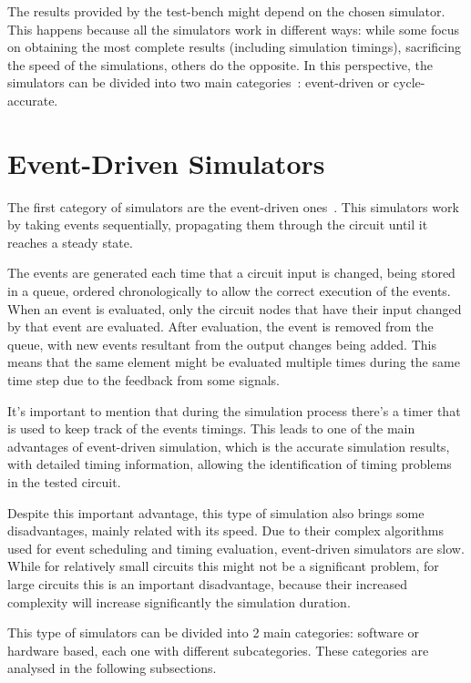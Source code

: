 The results provided by the test-bench might depend on the chosen
simulator. This happens because all the simulators work in different ways: while
some focus on obtaining the most complete results (including simulation
timings), sacrificing the speed of the simulations, others do the opposite. In
this perspective, the simulators can be divided into two main categories~\cite{tan:vhstas,palnitkar:verilog}: event-driven or cycle-accurate.

\section{Event-Driven Simulators}
\label{section:event}

The first category of simulators are the event-driven
ones~\cite{tan:vhstas,gunes:survey,palnitkar:verilog}. This simulators work by
taking events sequentially, propagating them through the circuit until it
reaches a steady state.

The events are generated each time that a circuit input is changed, being stored
in a queue, ordered chronologically to allow the correct execution of the
events. When an event is evaluated, only the circuit nodes that have their input
changed by that event are evaluated. After evaluation, the event is removed from
the queue, with new events resultant from the output changes being added. This
means that the same element might be evaluated multiple times during the same
time step due to the feedback from some signals.

It's important to mention that during the simulation process there's a timer
that is used to keep track of the events timings. This leads to one of the main
advantages of event-driven simulation, which is the accurate simulation results,
with detailed timing information, allowing the identification of timing problems
in the tested circuit.

Despite this important advantage, this type of simulation also brings some
disadvantages, mainly related with its speed. Due to their complex algorithms
used for event scheduling and timing evaluation, event-driven simulators are
slow. While for relatively small circuits this might not be a significant
problem, for large circuits this is an important disadvantage, because their
increased complexity will increase significantly the simulation duration.

This type of simulators can be divided into 2 main categories: software or
hardware based, each one with different subcategories. These categories are
analysed in the following subsections.


